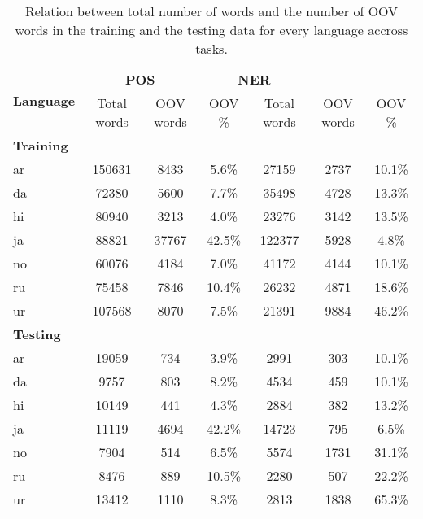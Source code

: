 \begin{table}[h!]
    \centering
    \begin{tabular}{l c c c|c c c}
        \toprule
        \multirow{2}{*}{\bfseries Language} &
        \multicolumn{2}{c}{\bfseries POS} &
        \multicolumn{2}{c}{\bfseries NER} \\

        \cmidrule(lr){2-7}
        & Total words & OOV words & OOV \%
        & Total words & OOV words & OOV \% \\

        \cmidrule(lr){1-7}
        \multicolumn{7}{l}{\bfseries Training} \\

        \cmidrule(lr){1-7}
        ar & 150631 &  8433 &  5.6\% &  27159 & 2737 & 10.1\% \\
        da &  72380 &  5600 &  7.7\% &  35498 & 4728 & 13.3\% \\
        hi &  80940 &  3213 &  4.0\% &  23276 & 3142 & 13.5\% \\
        ja &  88821 & 37767 & 42.5\% & 122377 & 5928 &  4.8\% \\
        no &  60076 &  4184 &  7.0\% &  41172 & 4144 & 10.1\% \\
        ru &  75458 &  7846 & 10.4\% &  26232 & 4871 & 18.6\% \\
        ur & 107568 &  8070 &  7.5\% &  21391 & 9884 & 46.2\% \\

        \cmidrule(lr){1-7}
        \multicolumn{7}{l}{\bfseries Testing} \\

        \cmidrule(lr){1-7}
        ar & 19059 &  734 &  3.9\% &  2991 &  303 & 10.1\% \\
        da &  9757 &  803 &  8.2\% &  4534 &  459 & 10.1\% \\
        hi & 10149 &  441 &  4.3\% &  2884 &  382 & 13.2\% \\
        ja & 11119 & 4694 & 42.2\% & 14723 &  795 &  6.5\% \\
        no &  7904 &  514 &  6.5\% &  5574 & 1731 & 31.1\% \\
        ru &  8476 &  889 & 10.5\% &  2280 &  507 & 22.2\% \\
        ur & 13412 & 1110 &  8.3\% &  2813 & 1838 & 65.3\% \\

        \bottomrule
    \end{tabular}
    \caption{Relation between total number of words and the number of OOV words
        in the training and the testing data for every language accross tasks.
    }\label{table:oov-percentages-total}
\end{table}



\pagebreak
